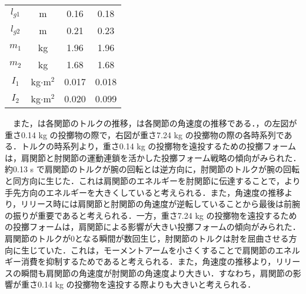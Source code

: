 \begin{small}
\begin{table}[tb]
\begin{center}
{\begin{tabular}{c|c|c|c}
      $l_{g1}$ & m & 0.16 & 0.18 \\
      $l_{g2}$ & m & 0.21 & 0.23 \\
      $m_{1}$ & kg & 1.96 & 1.96\\
      $m_{2}$ & kg & 1.68 & 1.68\\
      $I_{1}$ & kg$\cdot$$\mathrm{m}^2$ & 0.017 & 0.018 \\
      $I_{2}$ & kg$\cdot$$\mathrm{m}^2$ & 0.020 & 0.099 \\
      \hline
    \end{tabular}
    }
  \end{center}
\end{table}
　また，は各関節のトルクの推移，は各関節の角速度の推移である．，の左図が重さ0.14 kg の投擲物の際で，右図が重さ7.24 kg の投擲物の際の各時系列である．トルクの時系列より，重さ0.14 kg の投擲物を遠投するための投擲フォームは，肩関節と肘関節の運動連鎖を活かした投擲フォーム戦略の傾向がみられた．約0.13 s で肩関節のトルクが腕の回転とは逆方向に，肘関節のトルクが腕の回転と同方向に生じた．これは肩関節のエネルギーを肘関節に伝達することで，より手先方向のエネルギーを大きくしていると考えられる．また，角速度の推移より，リリース時には肩関節と肘関節の角速度が逆転していることから最後は前腕の振りが重要であると考えられる．一方，重さ7.24 kg の投擲物を遠投するための投擲フォームは，肩関節による影響が大きい投擲フォームの傾向がみられた．肩関節のトルクが0となる瞬間が数回生じ，肘関節のトルクは肘を屈曲させる方向に生じていた．これは，モーメントアームを小さくすることで肩関節のエネルギー消費を抑制するためであると考えられる．また，角速度の推移より，リリースの瞬間も肩関節の角速度が肘関節の角速度より大きい．すなわち，肩関節の影響が重さ0.14 kg の投擲物を遠投する際よりも大きいと考えられる．

\end{small}
